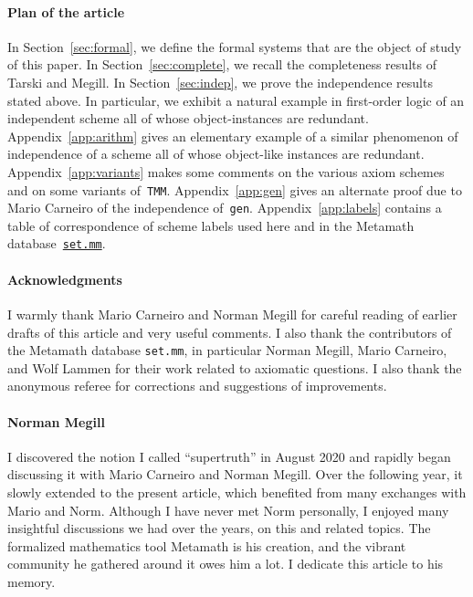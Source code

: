 \documentclass[11pt]{article}
\theoremstyle{plain}
\theoremstyle{definition}
\theoremstyle{remark}
\begin{document}
\paragraph{Plan of the article}
In Section~\ref{sec:formal}, we define the formal systems that are the object of study of this paper.
In Section~\ref{sec:complete}, we recall the completeness results of Tarski and Megill.
In Section~\ref{sec:indep}, we prove the independence results stated above.
In particular, we exhibit a natural example in first-order logic of an independent scheme all
of whose object-instances are redundant.
Appendix~\ref{app:arithm} gives an elementary example of a similar phenomenon of independence
of a scheme all of whose object-like instances are redundant.
Appendix~\ref{app:variants} makes some comments on the various axiom schemes and on some variants
of~\texttt{TMM}.
Appendix~\ref{app:gen} gives an alternate proof due to Mario Carneiro of the independence
of~\texttt{gen}.
Appendix~\ref{app:labels} contains a table of correspondence of scheme labels used here and
in the Metamath database~\href{https://us.metamath.org/mpeuni/mmset.html}{\texttt{set.mm}}.


\paragraph{Acknowledgments}
I warmly thank Mario Carneiro and Norman Megill for careful reading of earlier drafts of this
article and very useful comments.
I also thank the contributors of the Metamath database \texttt{set.mm}, in particular
Norman Megill, Mario Carneiro, and Wolf Lammen for their work related to axiomatic questions.
I also thank the anonymous referee for corrections and suggestions of improvements.


\paragraph{Norman Megill}
I discovered the notion I called ``supertruth'' in August 2020 and rapidly began discussing
it with Mario Carneiro and Norman Megill.
Over the following year, it slowly extended to the present article, which benefited from many
exchanges with Mario and Norm.
Although I have never met Norm personally, I enjoyed many insightful discussions we had over the
years, on this and related topics.
The formalized mathematics tool Metamath is his creation, and the vibrant community he gathered
around it owes him a lot.
I dedicate this article to his memory.
\end{document}

